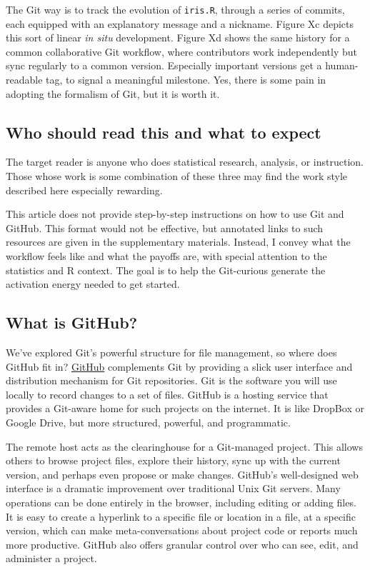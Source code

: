\documentclass[12pt]{article}
\begin{document}
The Git way is to track the evolution of \texttt{iris.R}, through a
series of commits, each equipped with an explanatory message and a
nickname. Figure Xc depicts this sort of linear \emph{in situ}
development. Figure Xd shows the same history for a common collaborative
Git workflow, where contributors work independently but sync regularly
to a common version. Especially important versions get a human-readable
tag, to signal a meaningful milestone. Yes, there is some pain in
adopting the formalism of Git, but it is worth it.

\subsection{Who should read this and what to
expect}\label{who-should-read-this-and-what-to-expect}

The target reader is anyone who does statistical research, analysis, or
instruction. Those whose work is some combination of these three may
find the work style described here especially rewarding.

This article does not provide step-by-step instructions on how to use
Git and GitHub. This format would not be effective, but annotated links
to such resources are given in the supplementary materials. Instead, I
convey what the workflow feels like and what the payoffs are, with
special attention to the statistics and R context. The goal is to help
the Git-curious generate the activation energy needed to get started.

\subsection{What is GitHub?}\label{what-is-github}

We've explored Git's powerful structure for file management, so where
does GitHub fit in? \href{https://github.com}{GitHub} complements Git by
providing a slick user interface and distribution mechanism for Git
repositories. Git is the software you will use locally to record changes
to a set of files. GitHub is a hosting service that provides a Git-aware
home for such projects on the internet. It is like DropBox or Google
Drive, but more structured, powerful, and programmatic.

The remote host acts as the clearinghouse for a Git-managed project.
This allows others to browse project files, explore their history, sync
up with the current version, and perhaps even propose or make changes.
GitHub's well-designed web interface is a dramatic improvement over
traditional Unix Git servers. Many operations can be done entirely in
the browser, including editing or adding files. It is easy to create a
hyperlink to a specific file or location in a file, at a specific
version, which can make meta-conversations about project code or reports
much more productive. GitHub also offers granular control over who can
see, edit, and administer a project.
\end{document}

